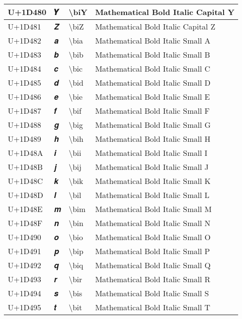 \begin{table}[h]
\begin{tabulary}{\linewidth}{|L|L|L|L|}
\hline
U+1D480 & 𝒀 & {\textbackslash}biY & Mathematical Bold Italic Capital Y \\
\hline
U+1D481 & 𝒁 & {\textbackslash}biZ & Mathematical Bold Italic Capital Z \\
\hline
U+1D482 & 𝒂 & {\textbackslash}bia & Mathematical Bold Italic Small A \\
\hline
U+1D483 & 𝒃 & {\textbackslash}bib & Mathematical Bold Italic Small B \\
\hline
U+1D484 & 𝒄 & {\textbackslash}bic & Mathematical Bold Italic Small C \\
\hline
U+1D485 & 𝒅 & {\textbackslash}bid & Mathematical Bold Italic Small D \\
\hline
U+1D486 & 𝒆 & {\textbackslash}bie & Mathematical Bold Italic Small E \\
\hline
U+1D487 & 𝒇 & {\textbackslash}bif & Mathematical Bold Italic Small F \\
\hline
U+1D488 & 𝒈 & {\textbackslash}big & Mathematical Bold Italic Small G \\
\hline
U+1D489 & 𝒉 & {\textbackslash}bih & Mathematical Bold Italic Small H \\
\hline
U+1D48A & 𝒊 & {\textbackslash}bii & Mathematical Bold Italic Small I \\
\hline
U+1D48B & 𝒋 & {\textbackslash}bij & Mathematical Bold Italic Small J \\
\hline
U+1D48C & 𝒌 & {\textbackslash}bik & Mathematical Bold Italic Small K \\
\hline
U+1D48D & 𝒍 & {\textbackslash}bil & Mathematical Bold Italic Small L \\
\hline
U+1D48E & 𝒎 & {\textbackslash}bim & Mathematical Bold Italic Small M \\
\hline
U+1D48F & 𝒏 & {\textbackslash}bin & Mathematical Bold Italic Small N \\
\hline
U+1D490 & 𝒐 & {\textbackslash}bio & Mathematical Bold Italic Small O \\
\hline
U+1D491 & 𝒑 & {\textbackslash}bip & Mathematical Bold Italic Small P \\
\hline
U+1D492 & 𝒒 & {\textbackslash}biq & Mathematical Bold Italic Small Q \\
\hline
U+1D493 & 𝒓 & {\textbackslash}bir & Mathematical Bold Italic Small R \\
\hline
U+1D494 & 𝒔 & {\textbackslash}bis & Mathematical Bold Italic Small S \\
\hline
U+1D495 & 𝒕 & {\textbackslash}bit & Mathematical Bold Italic Small T \\

\end{tabulary}
\end{table}
